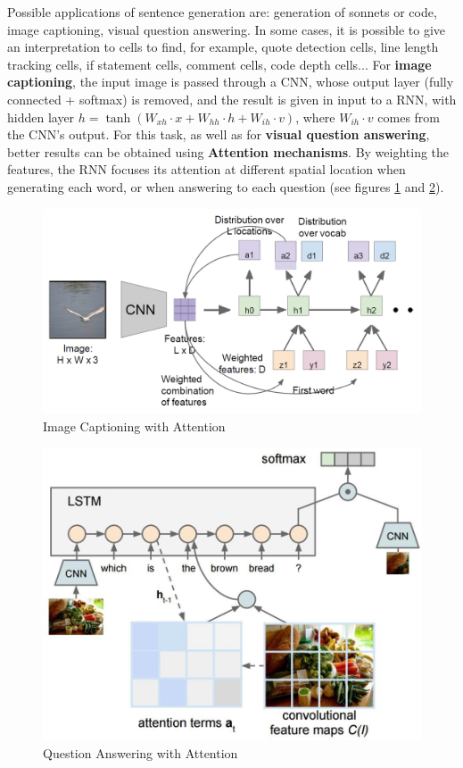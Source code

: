Possible applications of sentence generation are: generation of sonnets or code, image captioning, visual question answering. In some cases, it is possible to give an interpretation to cells to find, for example, quote detection cells, line length tracking cells, if statement cells, comment cells, code depth cells...
\newpage
For \textbf{image captioning}, the input image is passed through a CNN, whose output layer (fully connected + softmax) is removed, and the result is given in input to a RNN, with hidden layer $h = \tanh(W_{xh} \cdot x + W_{hh} \cdot h + W_{ih} \cdot v)$, where $W_{ih} \cdot v$ comes from the CNN's output. For this task, as well as for \textbf{visual question answering}, better results can be obtained using \textbf{Attention mechanisms}. By weighting the features, the RNN focuses its attention at different spatial location when generating each word, or when answering to each question (see figures \ref{fig:seq-attention1} and \ref{fig:seq-attention2}).

\begin{minipage}{.6\linewidth}
    \begin{figure}[H]
        \centering
        \includegraphics[width=0.9\linewidth]{images/seq-attention1}
        \caption[Image Captioning with Attention]{Image Captioning with Attention}
        \label{fig:seq-attention1}
    \end{figure}
\end{minipage}
\begin{minipage}{.4\linewidth}
    \begin{figure}[H]
        \centering
        \includegraphics[width=0.8\linewidth]{images/seq-attention2}
        \caption[Question Answering with Attention]{Question Answering with Attention}
        \label{fig:seq-attention2}
    \end{figure}
\end{minipage}

